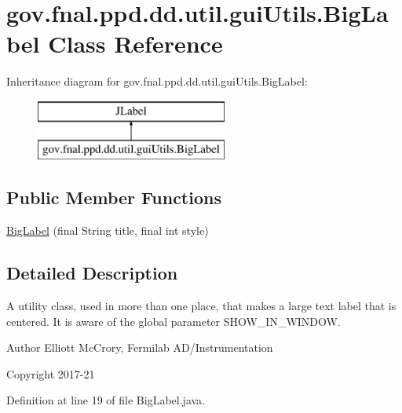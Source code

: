 \hypertarget{classgov_1_1fnal_1_1ppd_1_1dd_1_1util_1_1guiUtils_1_1BigLabel}{\section{gov.\-fnal.\-ppd.\-dd.\-util.\-gui\-Utils.\-Big\-Label Class Reference}
\label{classgov_1_1fnal_1_1ppd_1_1dd_1_1util_1_1guiUtils_1_1BigLabel}
}
Inheritance diagram for gov.\-fnal.\-ppd.\-dd.\-util.\-gui\-Utils.\-Big\-Label\-:\begin{figure}[H]
\begin{center}
\leavevmode
\includegraphics[height=2.000000cm]{classgov_1_1fnal_1_1ppd_1_1dd_1_1util_1_1guiUtils_1_1BigLabel}
\end{center}
\end{figure}
\subsection*{Public Member Functions}
\begin{DoxyCompactItemize}
\item 
\hyperlink{classgov_1_1fnal_1_1ppd_1_1dd_1_1util_1_1guiUtils_1_1BigLabel_a893a2b6ab9309341513be1ae20841a01}{Big\-Label} (final String title, final int style)
\end{DoxyCompactItemize}


\subsection{Detailed Description}
A utility class, used in more than one place, that makes a large text label that is centered. It is aware of the global parameter S\-H\-O\-W\-\_\-\-I\-N\-\_\-\-W\-I\-N\-D\-O\-W.

\begin{DoxyAuthor}{Author}
Elliott Mc\-Crory, Fermilab A\-D/\-Instrumentation 
\end{DoxyAuthor}
\begin{DoxyCopyright}{Copyright}
2017-\/21 
\end{DoxyCopyright}


Definition at line 19 of file Big\-Label.\-java.



